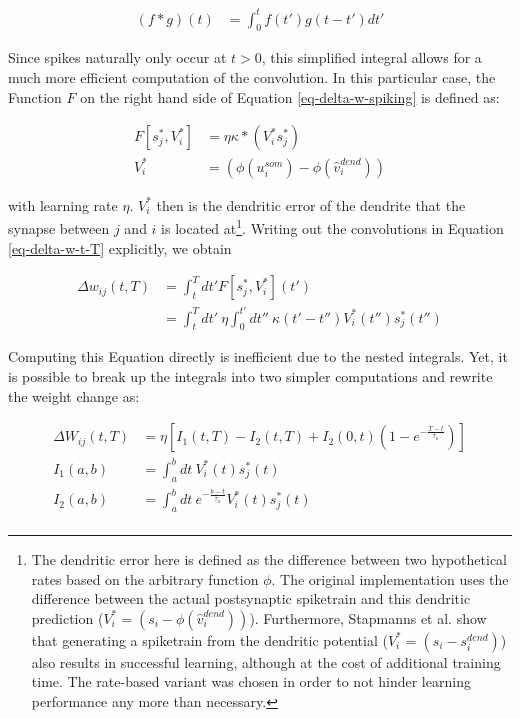 \begin{align}
  (f \ast g)(t) & = \int_{0}^{t} f(t') g(t-t') d t'
\end{align}

Since spikes naturally only occur at $t>0$, this simplified integral allows for a much more efficient computation of the
convolution. In this particular case, the Function $F$ on the right hand side of Equation \ref{eq-delta-w-spiking} is
defined as:

\begin{align}
  F[s_j^\ast, V_i^\ast] & = \eta \kappa \ast (V_i^\ast s_j^\ast)        \\
  V_i^\ast              & = (\phi(u_i^{som}) - \phi(\hat{v}_i^{dend}) )
\end{align}

 with learning rate $\eta$. $V_i^\ast$ then is the dendritic error of the dendrite that the synapse
between $j$ and $i$ is located at\footnote{The dendritic error here is defined as the difference between two
hypothetical rates based on the arbitrary function $\phi$. The original implementation uses the difference between the
actual postsynaptic spiketrain and this dendritic prediction ($V_i^\ast = (s_i - \phi(\hat{v}_i^{dend}) )$).
Furthermore, Stapmanns et al. show that generating a spiketrain from the dendritic potential ($V_i^\ast = (s_i -
s_i^{dend})$) also results in successful learning, although at the cost of additional training time. The rate-based
variant was chosen in order to not hinder learning performance any more than necessary.}. Writing out the convolutions
in Equation \ref{eq-delta-w-t-T} explicitly, we obtain

\begin{align}
  \Delta w_{ij}(t,T) & = \int_t^T dt' F[s_j^\ast, V_i^\ast](t')                                                                           \\
                     & =  \int_t^T dt' \  \eta\int_0^{t'} dt'' \ \kappa(t'-t'') V_i^\ast (t'') s_j^\ast (t'') \label{eq-delta-w-t-T-long}
\end{align}

Computing this Equation directly is inefficient due to the nested integrals. Yet, it is possible to break up the
integrals into two simpler computations and rewrite the weight change as:


\begin{align}
  \Delta W_{ij}(t, T) & = \eta \left[ I_1 (t, T) - I_2(t,T) + I_2(0,t)\left( 1- e^{-\frac{T-t}{\tau_\kappa}} \right) \right] \\
  I_1(a, b)           & = \int_{a}^{b} dt \ V_i^\ast (t) s_j^\ast (t)                                                        \\
  I_2(a, b)           & = \int_{a}^{b} dt \ e^{-\frac{b-t}{\tau_\kappa}} V_i^\ast (t) s_j^\ast (t)                           \\
\end{align}

